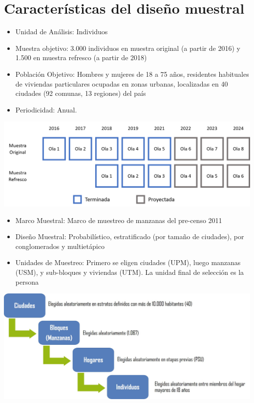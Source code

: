 \documentclass[
  12pt,
]{book}
\begin{document}
\hypertarget{caracteruxedsticas-del-diseuxf1o-muestral}{%
\section{Características del diseño muestral}\label{caracteruxedsticas-del-diseuxf1o-muestral}}

\begin{itemize}
\item
  Unidad de Análisis: Individuos
\item
  Muestra objetivo: 3.000 individuos en muestra original (a partir de 2016) y 1.500 en muestra refresco (a partir de 2018)
\item
  Población Objetivo: Hombres y mujeres de 18 a 75 años, residentes habituales de viviendas particulares ocupadas en zonas urbanas, localizadas en 40 ciudades (92 comunas, 13 regiones) del país
\item
  Periodicidad: Anual.
\end{itemize}

\includegraphics[width=22.1in]{1_input/imagenes/olas_elsoc}

\begin{itemize}
\item
  Marco Muestral: Marco de muestreo de manzanas del pre-censo 2011
\item
  Diseño Muestral: Probabilístico, estratificado (por tamaño de ciudades), por conglomerados y multietápico
\item
  Unidades de Muestreo: Primero se eligen ciudades (UPM), luego manzanas (USM), y sub-bloques y viviendas (UTM). La unidad final de selección es la persona
\end{itemize}

\includegraphics[width=25.24in]{1_input/imagenes/etapas_seleccion}
\end{document}
